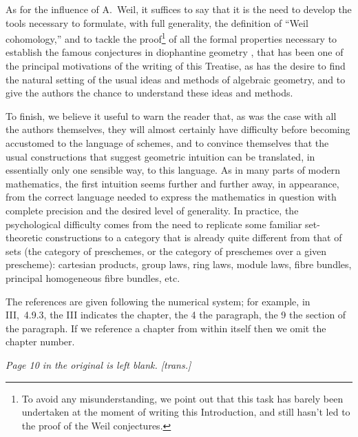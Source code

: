 As for the influence of A.~Weil, it suffices to say that it is the need to
develop the tools necessary to formulate, with full generality, the definition
of ``Weil cohomology,'' and to tackle the proof\footnote{To avoid any
misunderstanding, we point out that this task has barely been undertaken at the
moment of writing this Introduction, and still hasn't led to the proof of the
Weil conjectures.} of all the formal properties necessary to establish the
famous conjectures in diophantine geometry \cite{19}, that has been one of the
principal motivations of the writing of this Treatise, as has the desire to find
the natural setting of the usual ideas and methods of algebraic geometry, and to
give the authors the chance to understand these ideas and methods.

\asttri

To finish, we believe it useful to warn the reader that, as was the case with
all the authors themselves, they will almost certainly have difficulty before
becoming accustomed to the language of schemes, and to convince themselves that
the usual constructions that suggest geometric intuition can be translated, in
essentially only one sensible way, to this language. As in many parts of modern
mathematics, the first intuition seems further and further away, in appearance,
from the correct language needed to express the mathematics in question with
complete precision and the desired level of generality. In practice, the
psychological difficulty comes from the need to replicate some familiar
set-theoretic constructions to a category that is already quite different from
that of sets (the category of preschemes, or the category of preschemes over a
given prescheme): cartesian products, group laws, ring laws, module laws, fibre
bundles, principal homogeneous fibre bundles, etc. 

\asttri

The references are given following the numerical system; for example, in
III,~4.9.3, the III indicates the chapter, the 4 the paragraph, the 9 the
section of the paragraph. If we reference a chapter from within itself then we
omit the chapter number.

\bigskip

\emph{Page 10 in the original is left blank. [trans.]}


